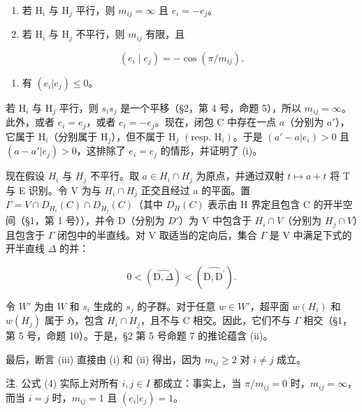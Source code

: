 \begin{enumerate}
\def\labelenumi{(\roman{enumi})}
\item
若 \(\mathrm{H}_i\) 与 \(\mathrm{H}_j\) 平行，则 \(m_{ij} = \infty\) 且 \(e_i = -e_j\)。
\item
若 \(\mathrm{H}_i\) 与 \(\mathrm{H}_j\) 不平行，则 \(m_{ij}\) 有限，且
\end{enumerate}

\[
\left(e _ {i} \mid e _ {j}\right) = - \cos (\pi / m _ {i j}).\tag{4}
\]

\begin{enumerate}
\def\labelenumi{(\roman{enumi})}
\setcounter{enumi}{2}
\tightlist
\item
有 \((e_i|e_j)\leqslant 0\)。
\end{enumerate}

若 \(\mathrm{H}_i\) 与 \(\mathrm{H}_j\) 平行，则 \(s_i s_j\) 是一个平移（§2，第 4 号，命题 5），所以 \(m_{ij} = \infty\)。此外，或者 \(e_i = e_j\)，或者 \(e_i = -e_j\)。现在，闭包 C 中存在一点 \(a\)（分别为 \(a'\)），它属于 \(\mathrm{H}_i\)（分别属于 \(\mathrm{H}_j\)），但不属于 \(\mathrm{H}_j\) \((\text{resp. } \mathrm{H}_i)\)。于是 \((a' - a|e_i) > 0\) 且 \((a - a'|e_j) > 0\)，这排除了 \(e_i = e_j\) 的情形，并证明了 (i)。

现在假设 \(H_{i}\) 与 \(H_{j}\) 不平行。取 \(a \in H_{i} \cap H_{j}\) 为原点，并通过双射 \(t \mapsto a + t\) 将 T 与 E 识别。令 V 为与 \(H_{i} \cap H_{j}\) 正交且经过 a 的平面。置 \(\Gamma = V \cap D_{H_{i}}(C) \cap D_{H_{j}}(C)\)（其中 \(D_{H}(C)\) 表示由 H 界定且包含 C 的开半空间（§1，第 1 号）），并令 D（分别为 \(D'\)）为 V 中包含于 \(H_{i} \cap V\)（分别为 \(H_{j} \cap V\)）且包含于 \(\Gamma\) 闭包中的半直线。对 V 取适当的定向后，集合 \(\Gamma\) 是 V 中满足下式的开半直线 \(\Delta\) 的并：

\[
0 <   (\widehat {\mathrm{D} , \Delta}) <   (\widehat {\mathrm{D} , \mathrm{D} ^ {\prime}}).
\]

令 \(W'\) 为由 \(W\) 和 \(s_i\) 生成的 \(s_j\) 的子群。对于任意 \(w \in W'\)，超平面 \(w(H_i)\) 和 \(w(H_j)\) 属于 \(\mathfrak{H}\)，包含 \(H_i \cap H_j\)，且不与 C 相交。因此，它们不与 \(\Gamma\) 相交（§1，第 5 号，命题 10）。于是，§2 第 5 号命题 7 的推论蕴含 (ii)。

最后，断言 (iii) 直接由 (i) 和 (ii) 得出，因为 \(m_{ij} \geqslant 2\) 对 \(i \neq j\) 成立。

注. 公式 (4) 实际上对所有 \(i, j \in I\) 都成立：事实上，当 \(\pi / m_{ij} = 0\) 时，\(m_{ij} = \infty\)，而当 \(i = j\) 时，\(m_{ij} = 1\) 且 \((e_i | e_j) = 1\)。

